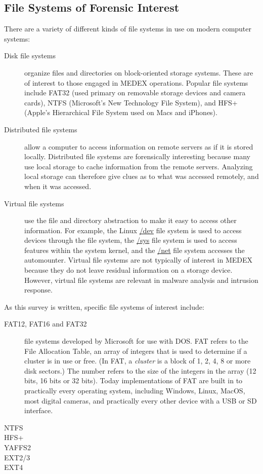 \documentclass[11pt,letter]{article}
\begin{document}
\subsection{File Systems of Forensic Interest}
There are a variety of different kinds of file systems in use on
modern computer systems:
\begin{description}
\item[Disk file systems] organize files and directories on
  block-oriented storage systems. These are of interest to those
  engaged in MEDEX operations. Popular file systems include FAT32
  (used primary on removable storage devices and camera cards), NTFS
  (Microsoft's New Technology File System), and HFS+ (Apple's
  Hierarchical File System used on Macs and iPhones).
\item[Distributed file systems] allow a computer to access
  information on remote servers as if it is stored
  locally. Distributed file systems are forensically interesting
  because many use local storage to cache information from the remote
  servers. Analyzing local storage can therefore give clues as to what
  was accessed remotely, and when it was accessed.
\item[Virtual file systems] use the file and directory abstraction to
  make it easy to access other information. For example, the Linux
  \url{/dev} file system is used to access devices through the file
  system, the \url{/sys} file system is used to access features within
  the system kernel, and the \url{/net} file system accesses the
  automounter. Virtual file systems are not typically of interest in
  MEDEX because they do not leave residual information on a storage
  device. However, virtual file systems are relevant in malware
  analysis and intrusion response.
\end{description}

As this survey is written, specific file systems of interest include:
\begin{description}
\item[FAT12, FAT16 and FAT32] file systems developed by Microsoft for use with
  DOS. FAT refers to the File Allocation Table, an array of integers
  that is used to determine if a cluster is in use or free. (In FAT, a
  \emph{cluster} is a block of 1, 2, 4, 8 or more disk sectors.) The number
  refers to the size of the integers in the array (12 bits, 16 bits or
  32 bits). Today implementations of FAT are built in to practically every
  operating system, including Windows, Linux, MacOS, most digital
  cameras, and practically every other device with a USB or SD
  interface. 
\item[NTFS] 
\item[HFS+]
\item[YAFFS2]
\item[EXT2/3]
\item[EXT4]
\end{description}
\end{document}
